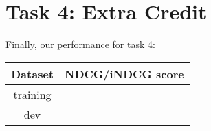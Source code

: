 \documentclass[10pt,twocolumn]{article}
\begin{document}
\section*{Task 4: Extra Credit}
Finally, our performance for task 4:
\begin{table}[H]
\centering
\begin{tabular}{|c|c|}
\hline
Dataset & NDCG/iNDCG score \\\hline
training & \\\hline
dev & \\\hline
\end{tabular}
\end{table}
\end{document}
